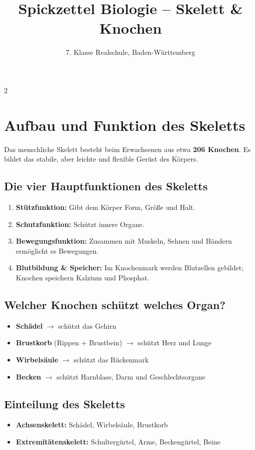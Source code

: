 \documentclass[12pt,a4paper]{article}
\title{Spickzettel Biologie -- Skelett \& Knochen}
\author{7. Klasse Realschule, Baden-Württemberg}
\date{}
\begin{document}
	
	\maketitle
	\begin{multicols}{2}
		
		\section*{Aufbau und Funktion des Skeletts}
		Das menschliche Skelett besteht beim Erwachsenen aus etwa \textbf{206 Knochen}. Es bildet das stabile, aber leichte und flexible Gerüst des Körpers.
		
		\subsection*{Die vier Hauptfunktionen des Skeletts}
		\begin{enumerate}[noitemsep]
			\item \textbf{Stützfunktion:} Gibt dem Körper Form, Größe und Halt. 
			\item \textbf{Schutzfunktion:} Schützt innere Organe.
			\item \textbf{Bewegungsfunktion:} Zusammen mit Muskeln, Sehnen und Bändern ermöglicht es Bewegungen.
			\item \textbf{Blutbildung \& Speicher:} Im Knochenmark werden Blutzellen gebildet; Knochen speichern Kalzium und Phosphat.
		\end{enumerate}
		
		\subsection*{Welcher Knochen schützt welches Organ?}
		\begin{itemize}[noitemsep]
			\item \textbf{Schädel} $\rightarrow$ schützt das Gehirn
			\item \textbf{Brustkorb} (Rippen + Brustbein) $\rightarrow$ schützt Herz und Lunge
			\item \textbf{Wirbelsäule} $\rightarrow$ schützt das Rückenmark
			\item \textbf{Becken} $\rightarrow$ schützt Harnblase, Darm und Geschlechtsorgane
		\end{itemize}
		
		\subsection*{Einteilung des Skeletts}
		\begin{itemize}[noitemsep]
			\item \textbf{Achsenskelett:} Schädel, Wirbelsäule, Brustkorb
			\item \textbf{Extremitätenskelett:} Schultergürtel, Arme, Beckengürtel, Beine
		\end{itemize}
		

\end{multicols}
\end{document}
